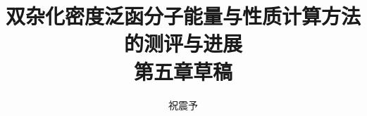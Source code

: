 



\title{\textbf{双杂化密度泛函分子能量与性质计算方法的测评与进展\\第五章草稿}}
\author{祝震予}
\maketitle
\vspace{-10pt}

\tableofcontents


\setcounter{section}{4}



\newpage






